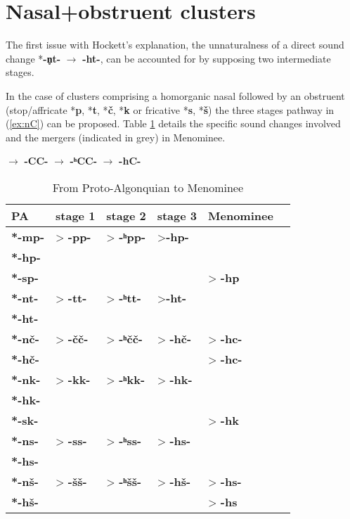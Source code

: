 \documentclass[oneside,a4paper,11pt]{article}
\newcommand{\ipa}[1]{{\phon\mbox{\textbf{#1}}}}
\newcommand{\grise}[1]{\cellcolor{lightgray}\textbf{#1}}
\begin{document}
\section{Nasal+obstruent clusters}
The first issue with Hockett's explanation, the unnaturalness of a direct sound change *\ipa{-n̥t-} $\rightarrow$ \ipa{-ht-}, can be accounted for by supposing two intermediate stages.

In the case of clusters comprising a homorganic nasal followed by an obstruent (stop/affricate *\ipa{p}, *\ipa{t}, *\ipa{č}, *\ipa{k} or fricative *\ipa{s}, *\ipa{š}) the three stages pathway in (\ref{ex:nC}) can be proposed. Table \ref{tab:gem} details the specific sound changes involved and the mergers (indicated in grey) in Menominee.

\begin{exe}
\ex \label{ex:nC}
\glt *\ipa{-nC-} $\rightarrow$ \ipa{-CC-} $\rightarrow$ \ipa{-ʰCC-} $\rightarrow$ \ipa{-hC-} 
\end{exe}

\begin{table}[H]
\caption{From Proto-Algonquian to Menominee} \label{tab:gem} \centering
\begin{tabular}{llllll}
\toprule
PA & stage 1 & stage 2 & stage 3& Menominee \\
\midrule
\ipa{*-mp-} & > \ipa{-pp-} & > \ipa{-ʰpp-} &\grise{} >\ipa{-hp-} &\grise{}  \\
\ipa{*-hp-} &   &   &\grise{}   &\grise{}  \\
\ipa{*-sp-} &   &   &   &>\grise{} \ipa{-hp} \\
\midrule
\ipa{*-nt-} & > \ipa{-tt-} & > \ipa{-ʰtt-} & \grise{} >\ipa{-ht-} &\grise{}  \\
\ipa{*-ht-} &   &   &\grise{}   &\grise{}  \\
\midrule
\ipa{*-nč-} & > \ipa{-čč-} & > \ipa{-ʰčč-} &> \grise{} \ipa{-hč-} &>\grise{} \ipa{-hc-}  \\
\ipa{*-hč-} &   &   &\grise{}   &>\grise{} \ipa{-hc-}  \\
\midrule
\ipa{*-nk-} &> \ipa{-kk-} &> \ipa{-ʰkk-} &> \grise{}\ipa{-hk-} &\grise{}  \\
\ipa{*-hk-} &   &   &\grise{}   &\grise{}  \\
\ipa{*-sk-} &   &   &   &>\grise{} \ipa{-hk} \\
\midrule
\ipa{*-ns-} &> \ipa{-ss-} &> \ipa{-ʰss-} &>\grise{} \ipa{-hs-} &\grise{}  \\
\ipa{*-hs-} &   &   &\grise{}   &\grise{}  \\
\cline{1-5}
\ipa{*-nš-} &> \ipa{-šš-} &> \ipa{-ʰšš-} &> \ipa{-hš-} \grise{}&>\grise{}  \ipa{-hs-}\\
\ipa{*-hš-} &   &   &   \grise{}&>\grise{} \ipa{-hs} \\
\bottomrule
\end{tabular}
\end{table}
\end{document}
